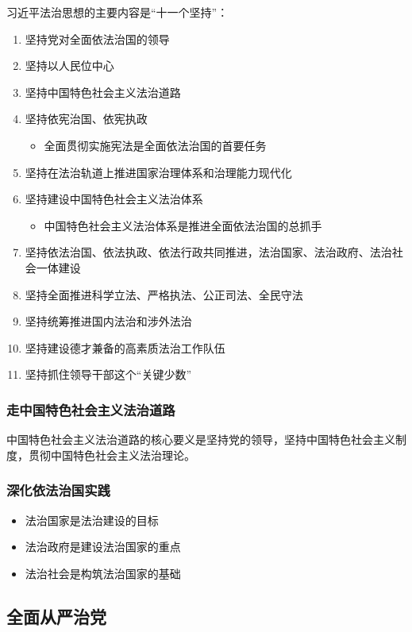 \documentclass[12pt, a4paper, oneside]{ctexart}
\begin{document}
习近平法治思想的主要内容是“十一个坚持”：
\begin{enumerate}
  \item 坚持党对全面依法治国的领导
  \item 坚持以人民位中心
  \item 坚持中国特色社会主义法治道路
  \item 坚持依宪治国、依宪执政
  \begin{itemize}
    \item 全面贯彻实施宪法是全面依法治国的首要任务
  \end{itemize}
  \item 坚持在法治轨道上推进国家治理体系和治理能力现代化
  \item 坚持建设中国特色社会主义法治体系
  \begin{itemize}
    \item 中国特色社会主义法治体系是推进全面依法治国的总抓手
  \end{itemize}
  \item 坚持依法治国、依法执政、依法行政共同推进，法治国家、法治政府、法治社会一体建设
  \item 坚持全面推进科学立法、严格执法、公正司法、全民守法
  \item 坚持统筹推进国内法治和涉外法治
  \item 坚持建设德才兼备的高素质法治工作队伍
  \item 坚持抓住领导干部这个“关键少数”
\end{enumerate}

\subsubsection{走中国特色社会主义法治道路}

中国特色社会主义法治道路的核心要义是坚持党的领导，坚持中国特色社会主义制度，贯彻中国特色社会主义法治理论。

\subsubsection{深化依法治国实践}

\begin{itemize}
  \item 法治国家是法治建设的目标
  \item 法治政府是建设法治国家的重点
  \item 法治社会是构筑法治国家的基础
\end{itemize}

\subsection{全面从严治党}
\end{document}
